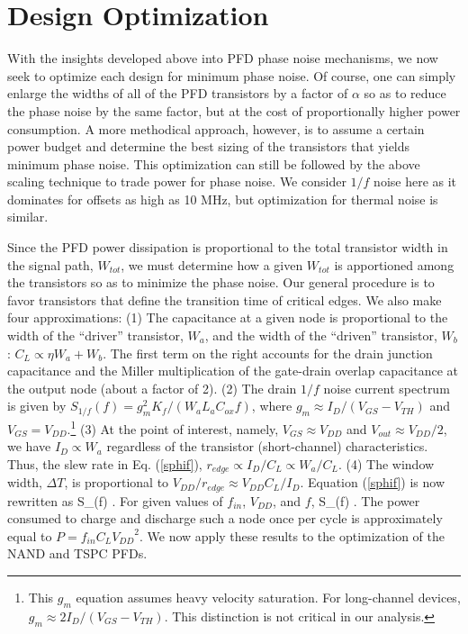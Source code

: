 \section{Design Optimization}
With the insights developed above into PFD phase noise mechanisms, we now seek to optimize each design for minimum phase
noise. Of course, one can simply enlarge the widths of all of the PFD transistors by a factor of $\alpha$ so as to
reduce the phase noise by the same factor, but at the cost of proportionally higher power consumption. A more methodical approach,
however, is to assume a certain power budget and determine the best sizing of the transistors
that yields minimum phase noise. This optimization can still be followed by the above scaling technique to trade
power for phase noise. We consider $1/f$ noise here as it dominates for offsets as high as 10 MHz, but optimization for
thermal noise is similar.

Since the PFD power dissipation is proportional to the total transistor width in the signal path, $W_{tot}$, we must
determine how a given $W_{tot}$ is apportioned among the transistors so as to minimize the phase noise. Our general
procedure is to favor transistors that define the transition time of critical edges. We also make four approximations: (1)
The capacitance at a given node is proportional to the width of the ``driver'' transistor, $W_a$, and the width of the
``driven'' transistor, $W_b$: $ C_L \propto \eta W_a + W_b$. The first term on the right accounts for the drain junction
capacitance and the Miller multiplication of the gate-drain overlap capacitance at the output node (about a factor of 2).
(2) The drain $1/f$ noise current spectrum is given by $S_{1/f}(f)=g_m^2 K_f/(W_a L_a C_{ox} f)$, where $g_m \approx I_D /
(V_{GS}-V_{TH})$ and $V_{GS}=V_{DD}$.\footnote{This $g_m$ equation assumes heavy velocity saturation. For long-channel
devices, $g_m \approx 2 I_D /(V_{GS}-V_{TH})$. This distinction is not critical in our analysis.} (3) At the point of
interest, namely, $V_{GS} \approx V_{DD}$ and $V_{out} \approx V_{DD}/2$, we have $I_D \propto W_a$ regardless of the
transistor (short-channel) characteristics. Thus, the slew rate in Eq. (\ref{sphif}), $r_{edge} \propto I_D / C_L \propto W_a /
C_L$. (4) The window width, $\Delta T$, is proportional to $V_{DD}/r_{edge} \approx V_{DD}C_L/I_D$. Equation (\ref{sphif}) is
now rewritten as
\beq
S_{\Phi}(f) \propto {}.
\label{sphifsimple}
\eeq
For given values of $f_{in}$, $V_{DD}$, and $f$,
\beq
S_{\Phi}(f) \propto {}.
\label{sphifprop}
\eeq
The power consumed to charge and discharge such a node once per cycle is approximately equal to $P = f_{in} C_L
{V_{DD}}^2$. We now apply these results to the optimization of the NAND and TSPC PFDs.

